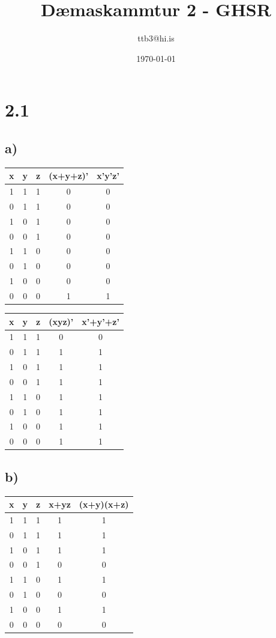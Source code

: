 \documentclass{article}
\title{Dæmaskammtur 2 - GHSR}
\author{ttb3@hi.is}
\date{\today}
\begin{document}
\maketitle


\section*{2.1}
\subsection*{a)}
\begin{center}
    \begin{tabular}{|c|c|c|c|c|}
        \hline
        x&y&z&(x+y+z)'&x'y'z'\\
        \hline
        1&1&1&0&0\\
        0&1&1&0&0\\
        1&0&1&0&0\\
        0&0&1&0&0\\
        1&1&0&0&0\\
        0&1&0&0&0\\
        1&0&0&0&0\\
        0&0&0&1&1\\
        \hline
    \end{tabular}
    \quad
    \begin{tabular}{|c|c|c|c|c|}
        \hline
        x&y&z&(xyz)'&x'+y'+z'\\
        \hline
        1&1&1&0&0\\
        0&1&1&1&1\\
        1&0&1&1&1\\
        0&0&1&1&1\\
        1&1&0&1&1\\
        0&1&0&1&1\\
        1&0&0&1&1\\
        0&0&0&1&1\\
        \hline
    \end{tabular}
\end{center}

\subsection*{b)}
\begin{center}
    \begin{tabular}{|c|c|c|c|c|}
        \hline
        x&y&z&x+yz&(x+y)(x+z)\\
        \hline
        1&1&1&1&1\\
        0&1&1&1&1\\
        1&0&1&1&1\\
        0&0&1&0&0\\
        1&1&0&1&1\\
        0&1&0&0&0\\
        1&0&0&1&1\\
        0&0&0&0&0\\
        \hline
    \end{tabular}
\end{center}
\end{document}
